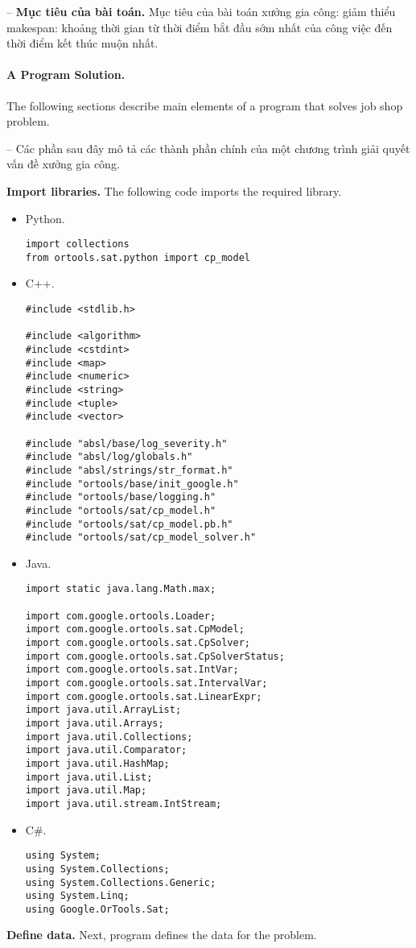 \documentclass{article}
\begin{document}
-- {\bf Mục tiêu của bài toán.} Mục tiêu của bài toán xưởng gia công: giảm thiểu makespan: khoảng thời gian từ thời điểm bắt đầu sớm nhất của công việc đến thời điểm kết thúc muộn nhất.

\paragraph{A Program Solution.} The following sections describe main elements of a program that solves job shop problem.

-- Các phần sau đây mô tả các thành phần chính của một chương trình giải quyết vấn đề xưởng gia công.

{\bf Import libraries.} The following code imports the required library.
\begin{itemize}
    \item {\sf Python.}
    \begin{verbatim}
import collections
from ortools.sat.python import cp_model
    \end{verbatim}
    \item {\sf C++.}
    \begin{verbatim}
#include <stdlib.h>

#include <algorithm>
#include <cstdint>
#include <map>
#include <numeric>
#include <string>
#include <tuple>
#include <vector>

#include "absl/base/log_severity.h"
#include "absl/log/globals.h"
#include "absl/strings/str_format.h"
#include "ortools/base/init_google.h"
#include "ortools/base/logging.h"
#include "ortools/sat/cp_model.h"
#include "ortools/sat/cp_model.pb.h"
#include "ortools/sat/cp_model_solver.h"
    \end{verbatim}
    \item {\sf Java.}
    \begin{verbatim}
import static java.lang.Math.max;

import com.google.ortools.Loader;
import com.google.ortools.sat.CpModel;
import com.google.ortools.sat.CpSolver;
import com.google.ortools.sat.CpSolverStatus;
import com.google.ortools.sat.IntVar;
import com.google.ortools.sat.IntervalVar;
import com.google.ortools.sat.LinearExpr;
import java.util.ArrayList;
import java.util.Arrays;
import java.util.Collections;
import java.util.Comparator;
import java.util.HashMap;
import java.util.List;
import java.util.Map;
import java.util.stream.IntStream;
    \end{verbatim}
    \item {\sf C\#.}
    \begin{verbatim}
using System;
using System.Collections;
using System.Collections.Generic;
using System.Linq;
using Google.OrTools.Sat;
    \end{verbatim}
\end{itemize}
{\bf Define data.} Next, program defines the data for the problem.
\end{document}
